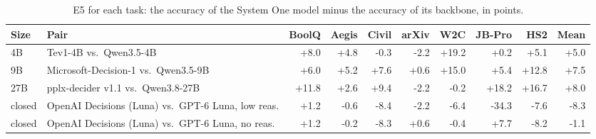 \begin{table}[t]
\centering
\small
\setlength{\tabcolsep}{3.5pt}
\begin{tabular}{llrrrrrrrr}
\toprule
Size & Pair & BoolQ & Aegis & Civil & arXiv & W2C & JB-Pro & HS2 & Mean \\
\midrule
4B & Tev1-4B vs.\ Qwen3.5-4B & +8.0 & +4.8 & -0.3 & -2.2 & +19.2 & +0.2 & +5.1 & +5.0 \\
9B & Microsoft-Decision-1 vs.\ Qwen3.5-9B & +6.0 & +5.2 & +7.6 & +0.6 & +15.0 & +5.4 & +12.8 & +7.5 \\
27B & pplx-decider v1.1 vs.\ Qwen3.8-27B & +11.8 & +2.6 & +9.4 & -2.2 & -0.2 & +18.2 & +16.7 & +8.0 \\
closed & OpenAI Decisions (Luna) vs.\ GPT-6 Luna, low reas. & +1.2 & -0.6 & -8.4 & -2.2 & -6.4 & -34.3 & -7.6 & -8.3 \\
closed & OpenAI Decisions (Luna) vs.\ GPT-6 Luna, no reas. & +1.2 & -0.2 & -8.3 & +0.6 & -0.4 & +7.7 & -8.2 & -1.1 \\
\bottomrule
\end{tabular}
\caption{E5 for each task: the accuracy of the System One model minus the accuracy of its backbone, in points.}
\label{tab:app-e5}
\end{table}
